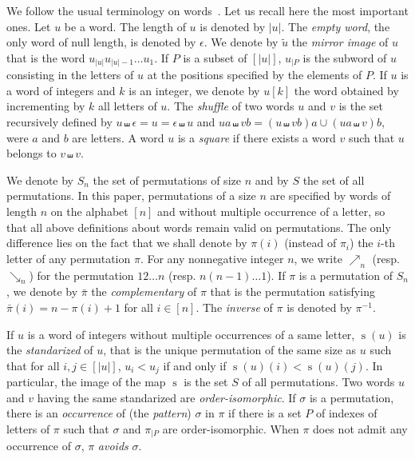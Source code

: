 \documentclass[a4paper]{llncs}
\DeclareMathOperator{\STD}{\mathrm{s}}
\begin{document}
We follow the usual terminology on words~\cite{ChoffrutKarhumaki1997}.
Let us recall here the most important ones. Let $u$ be a word. The
length of $u$ is denoted by $|u|$. The \emph{empty word}, the only word
of null length, is denoted by $\epsilon$. We denote by $\widetilde{u}$
the \emph{mirror image} of $u$ that is the word
$u_{|u|} u_{|u| - 1} \dots u_1$. If $P$ is a subset of $[|u|]$, $u_{|P}$
is the subword of $u$ consisting in the letters of $u$ at the positions
specified by the elements of $P$. If $u$ is a word of integers and $k$
is an integer, we denote by $u[k]$ the word obtained by incrementing by
$k$ all letters of $u$. The \emph{shuffle} of two words $u$ and $v$ is
the set recursively defined by
$u \shuffle \epsilon = u = \epsilon \shuffle u$ and
$ua \shuffle vb = (u \shuffle vb)a \cup (ua \shuffle v)b$, were $a$ and
$b$ are letters. A word $u$ is a \emph{square} if there exists a word $v$
such that $u$ belongs to $v \shuffle v$.

We denote by $S_n$ the set of permutations of size $n$ and by $S$ the
set of all permutations. In this paper, permutations of a size $n$ are
specified by words of length $n$ on the alphabet $[n]$ and without
multiple occurrence of a letter, so that all above definitions about
words remain valid on permutations. The only difference lies on the
fact that we shall denote by $\pi(i)$ (instead of $\pi_i$) the $i$-th
letter of any permutation $\pi$. For any nonnegative integer $n$, we
write $\nearrow_{n}$ (resp. $\searrow_{n}$) for the permutation
$1 2 \dots n$ (resp. $n (n-1) \dots 1$). If $\pi$ is a permutation of
$S_n$, we denote by $\bar \pi$ the \emph{complementary} of $\pi$ that is
the permutation satisfying $\bar \pi(i) = n - \pi(i) + 1$ for all
$i \in [n]$. The \emph{inverse} of $\pi$ is denoted by $\pi^{-1}$.

If $u$ is a word of integers without multiple occurrences of a same
letter, $\STD(u)$ is the \emph{standarized} of $u$, that is the unique
permutation of the same size as $u$ such that for all $i, j \in [|u|]$,
$u_i < u_j$ if and only if $\STD(u)(i) < \STD(u)(j)$. In particular, the
image of the map $\STD$ is the set $S$ of all permutations. Two words $u$
and $v$ having the same standarized are \emph{order-isomorphic}. If
$\sigma$ is a permutation, there is an \emph{occurrence} of (the
\emph{pattern}) $\sigma$ in $\pi$ if there is a set $P$ of indexes of
letters of $\pi$ such that $\sigma$ and $\pi_{|P}$ are order-isomorphic.
When $\pi$ does not admit any occurrence of $\sigma$, $\pi$ \emph{avoids}
$\sigma$.
\end{document}

